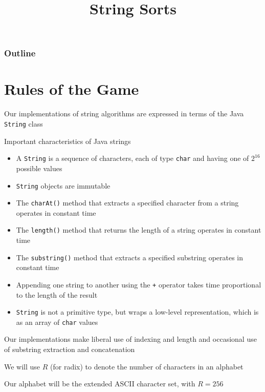 \documentclass[8pt,a4paper,compress]{beamer}
\title{String Sorts}
\date{}
\begin{document}
\begin{frame}
\vfill
\titlepage
\end{frame}

\begin{frame}
\frametitle{Outline}
\tableofcontents
\end{frame}

\section{Rules of the Game}
\begin{frame}[fragile]
\pause

Our implementations of string algorithms are expressed in terms of the Java \lstinline{String} class

\pause
\bigskip

Important characteristics of Java strings
\begin{itemize}
\item A \lstinline{String} is a sequence of characters, each of type \lstinline{char} and having one of $2^{16}$ possible values
\item \lstinline{String} objects are immutable
\item The \lstinline{charAt()} method that extracts a specified character from a string operates in constant time
\item The \lstinline{length()} method that returns the length of a string operates in constant time
\item The \lstinline{substring()} method that extracts a specified substring operates in constant time
\item Appending one string to another using the \lstinline{+} operator takes time proportional to the length of the result
\item \lstinline{String} is not a primitive type, but wraps a low-level representation, which is as an array of \lstinline{char} values
\end{itemize}

\pause
\bigskip

Our implementations make liberal use of indexing and length and occasional use of substring extraction and concatenation

\pause
\bigskip

We will use $R$ (for radix) to denote the number of characters in an alphabet

\pause
\bigskip

Our alphabet will be the extended ASCII character set, with $R=256$
\end{frame}
\end{document}
